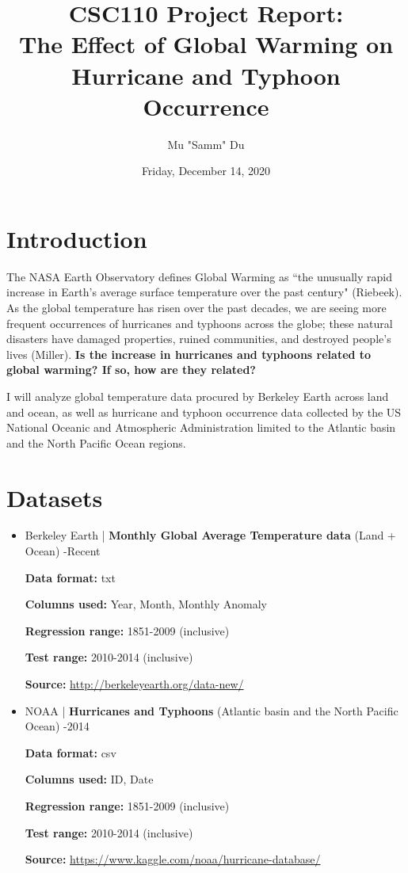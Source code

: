 \documentclass[fontsize=11pt]{article}
\title{CSC110 Project Report: \\The Effect of Global Warming on Hurricane and Typhoon Occurrence}
\author{Mu "Samm" Du}
\date{Friday, December 14, 2020}
\begin{document}
\maketitle

\section*{Introduction}

\qquad The NASA Earth Observatory defines Global Warming as ``the unusually rapid increase in Earth’s average surface temperature over the past century" (Riebeek). As the global temperature has risen over the past decades, we are seeing more frequent occurrences of hurricanes and typhoons across the globe; these natural disasters have damaged properties, ruined communities, and destroyed people's lives (Miller). \textbf{Is the increase in hurricanes and typhoons related to global warming? If so, how are they related?}

\enspace I will analyze global temperature data procured by Berkeley Earth across land and ocean, as well as hurricane and typhoon occurrence data collected by the US National Oceanic and Atmospheric Administration limited to the Atlantic basin and the North Pacific Ocean regions.

\section*{Datasets}
\begin{itemize}

    \item Berkeley Earth | \textbf{Monthly Global Average Temperature data} (Land + Ocean) -Recent

    \medskip

    \textbf{Data format:} txt

    \textbf{Columns used:} Year, Month, Monthly Anomaly

    \textbf{Regression range:} 1851-2009 (inclusive)

    \textbf{Test range:} 2010-2014 (inclusive)

    \textbf{Source:}
    \url{http://berkeleyearth.org/data-new/}

    \bigskip

    \item NOAA | \textbf{Hurricanes and Typhoons} (Atlantic
basin and the North Pacific Ocean) -2014

    \medskip

    \textbf{Data format:} csv

    \textbf{Columns used:} ID, Date

    \textbf{Regression range:} 1851-2009 (inclusive)

    \textbf{Test range:} 2010-2014 (inclusive)

    \textbf{Source:}
    \url{https://www.kaggle.com/noaa/hurricane-database/}

\end{itemize}
\end{document}
